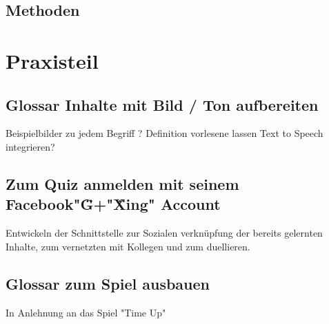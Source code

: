 \documentclass[a4paper, 12pt, twoside, BCOR=20mm, DIV=calc, abstracton, parskip=half*, toc=bibliography, toc=listof, headsepline, headings=small, numbers=enddot]{scrreprt} %
\begin{document}
\section{Methoden}

\section{} 
\chapter{Praxisteil}
\section{Glossar Inhalte mit Bild / Ton aufbereiten}
Beispielbilder zu jedem Begriff ? Definition vorlesene lassen Text to Speech integrieren?
\section{Zum Quiz anmelden mit seinem Facebook"\" G+"\"Xing"  Account}
Entwickeln der Schnittstelle zur Sozialen verknüpfung der bereits gelernten Inhalte, zum vernetzten mit Kollegen und zum duellieren. 
\section{Glossar zum Spiel ausbauen}
In Anlehnung an das Spiel "Time Up"

\printbibliography
\end{document}

